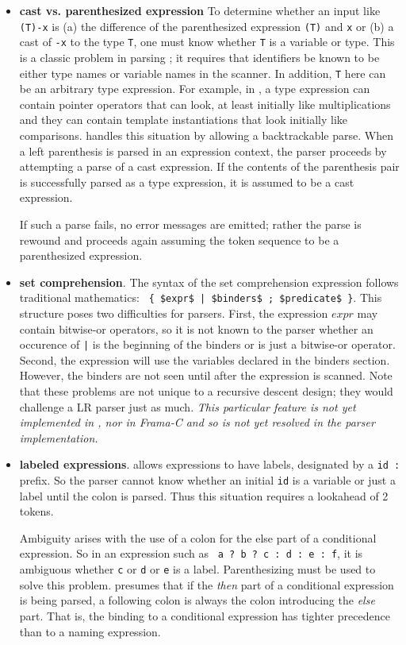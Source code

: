 \begin{itemize}
\item \textbf{cast vs. parenthesized expression} To determine whether an input like \lstinline|(T)-x| is (a) the difference of the parenthesized expression \lstinline|(T)| and \lstinline|x| or (b) a cast of \lstinline|-x| to the type \lstinline|T|, one must know whether \lstinline|T| is a variable or type. 
This is a classic problem in parsing \lang; it requires that identifiers be known to be either type names or variable names in the scanner. 
In addition, \lstinline|T| here can be an arbitrary type expression. 
For example, in \lang, a type expression can contain pointer operators that can look, at least initially like multiplications and they can contain template instantiations that look initially like comparisons. 
\fclang handles this situation by allowing a backtrackable parse. 
When a left parenthesis is parsed in an expression context, the parser proceeds by attempting a parse of a cast expression. If the contents of the parenthesis pair is successfully parsed as a type expression, it is assumed to be a cast expression. 

If such a parse fails, no error messages are emitted; rather the parse is rewound and proceeds again assuming the token sequence to be a parenthesized expression.

\item \textbf{set comprehension}. The syntax of the set comprehension expression follows traditional mathematics: \lstinline: { $expr$ | $binders$ ; $predicate$ }:. This structure poses two difficulties for parsers. First, the expression $expr$ may contain bitwise-or operators, so it is not known to the parser whether an occurence of \verb:|: is the beginning of the binders or is just a bitwise-or operator. Second, the expression will use the variables declared in the binders section. However, the binders are not seen until after the expression is scanned. Note that these problems are not unique to a recursive descent design; they would challenge a LR parser just as much. \textit{This particular feature is not yet implemented in \fclang, nor in Frama-C and so is not yet resolved in the parser implementation.}

\item \textbf{labeled expressions}. \acslpp allows expressions to have labels, designated by a \lstinline|id : | prefix. 
So the parser cannot know whether an initial \lstinline|id| is a variable or just a label until the colon is parsed. 
Thus this situation requires a lookahead of 2 tokens.

Ambiguity arises with the use of a colon for the else part of a conditional expression. 
So in an expression such as 
\lstinline| a ? b ? c : d : e : f|, it is ambiguous whether \lstinline|c| or \lstinline|d| or \lstinline|e| is a label. 
Parenthesizing must be used to solve this problem. 
\fcl presumes that if the \textit{then} part of a conditional expression is being parsed, a following colon is always the colon introducing the \textit{else} part. That is, the binding to a conditional expression has tighter precedence than to a naming expression.

\end{itemize}

